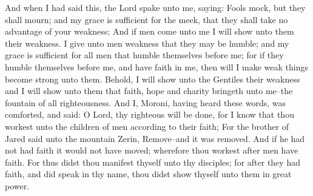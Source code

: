 And when I had said this, the Lord spake unto me, saying: Fools mock, but they shall mourn; and my grace is sufficient for the meek, that they shall take no advantage of your weakness;
\bverse \iffalse And if men come unto me I will show unto them their weakness.  I give unto men weakness that they may be humble; and my grace is sufficient for all men that humble themselves before me; for if they humble themselves before me, and have faith in me, then will I make weak things become strong unto them. \fi
And if men come unto me I will show unto them their weakness.  I give unto men weakness that they may be humble; and my grace is sufficient for all men that humble themselves before me; for if they humble themselves before me, and have faith in me, then will I make weak things become strong unto them.
\bverse \iffalse Behold, I will show unto the Gentiles their weakness and I will show unto them that faith, hope and charity bringeth unto me--the fountain of all righteousness. \fi
Behold, I will show unto the Gentiles their weakness and I will show unto them that faith, hope and charity bringeth unto me--the fountain of all righteousness.
\bverse \iffalse And I, Moroni, having heard these words, was comforted, and said: O Lord, thy righteous will be done, for I know that thou workest unto the children of men according to their faith; \fi
And I, Moroni, having heard these words, was comforted, and said: O Lord, thy righteous will be done, for I know that thou workest unto the children of men according to their faith;
\bverse \iffalse For the brother of Jared said unto the mountain Zerin, Remove--and it was removed. And if he had not had faith it would not have moved; wherefore thou workest after men have faith. \fi
For the brother of Jared said unto the mountain Zerin, Remove--and it was removed. And if he had not had faith it would not have moved; wherefore thou workest after men have faith.
\bverse \iffalse For thus didst thou manifest thyself unto thy disciples; for after they had faith, and did speak in thy name, thou didst show thyself unto them in great power. \fi
For thus didst thou manifest thyself unto thy disciples; for after they had faith, and did speak in thy name, thou didst show thyself unto them in great power.
\bverse \iffalse And I also remember that thou hast said that thou hast prepared a house for man, yea, even among the mansions of thy Father, in which man might have a more excellent hope; wherefore man must hope, or he cannot receive an inheritance in the place which thou hast prepared. \fi
